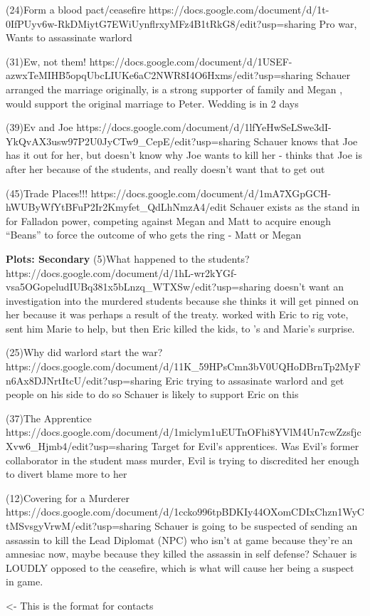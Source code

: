 \documentclass[char]{GL2020}
\begin{document}
(24)Form a blood pact/ceasefire
https://docs.google.com/document/d/1t-0IfPUyv6w-RkDMiytG7EWiUynflrxyMFz4B1tRkG8/edit?usp=sharing
Pro war, Wants to assassinate warlord

(31)Ew, not them!
https://docs.google.com/document/d/1USEF-azwxTeMIHB5opqUbcLIUKe6aC2NWR8I4O6Hxms/edit?usp=sharing
Schauer \cDiplomat{} arranged the marriage originally, is a strong supporter of family and Megan \cHeir{}, would support the original marriage to Peter.  Wedding is in 2 days

(39)Ev and Joe
https://docs.google.com/document/d/1lfYeHwSeLSwe3dI-YkQvAX3usw97P2U0JyCTw9_CepE/edit?usp=sharing
Schauer \cDiplomat{} knows that Joe has it out for her, but doesn’t know why Joe wants to kill her - thinks that Joe is after her because of the students, and really doesn’t want that to get out

(45)Trade Places!!!
https://docs.google.com/document/d/1mA7XGpGCH-hWUByWfYtBFuP2Ir2Kmyfet_QdLhNmzA4/edit
Schauer exists as the stand in for Falladon power, competing against Megan and Matt to acquire enough “Beans” to force the outcome of who gets the ring - Matt or Megan

\textbf{Plots: Secondary}
(5)What happened to the students?
https://docs.google.com/document/d/1hL-wr2kYGf-vsa5OGopeludIUBq381x5bLnzq_WTXSw/edit?usp=sharing
\cDiplomat{} doesn't want an investigation into the murdered students because she thinks it will get pinned on her because it was perhaps a result of the treaty.  \cDiplomat{} worked with Eric to rig vote, sent him Marie to help, but then Eric killed the kids, to \cDiplomat{}'s and Marie's surprise.

(25)Why did warlord start the war?
https://docs.google.com/document/d/11K_59HPsCmn3bV0UQHoDBrnTp2MyFn6Ax8DJNrtItcU/edit?usp=sharing
Eric \cEvil{}  trying to assasinate warlord and get people on his side to do so Schauer is likely to support Eric on this

(37)The Apprentice
https://docs.google.com/document/d/1miclym1uEUTnOFhi8YVlM4Un7cwZzsfjcXvw6_Hjmb4/edit?usp=sharing
Target for Evil's apprentices.  Was Evil's former collaborator in the student mass murder, Evil is trying to discredited her enough to divert blame more to her

(12)Covering for a Murderer
https://docs.google.com/document/d/1ccko996tpBDKIy44OXomCDIxChzn1WyCtMSvsgyVrwM/edit?usp=sharing
Schauer is going to be suspected of sending an assassin to kill the Lead Diplomat (NPC) who isn't at game because they're an amnesiac now, maybe because they killed the assassin in self defense?  Schauer is LOUDLY opposed to the ceasefire, which is what will cause her being a suspect in game.

\begin{itemz}[Goals]
	\item 
\end{itemz}

\begin{itemz}[Notes]
	\item 
\end{itemz}

\begin{contacts}
	\contact{\cTest{}} <- This is the format for contacts 
\end{contacts}
\end{document}
